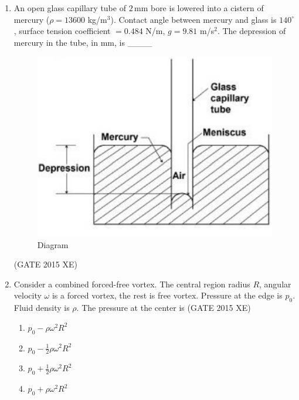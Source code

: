 \documentclass[journal,12pt,onecolumn]{IEEEtran}
\begin{document}
\begin{enumerate}
\hfill{(GATE 2015 XE)} 
\begin{multicols}{4}
\begin{enumerate}
\item $\frac{\mu}{\rho h^2}$
\item $0$
\item $\dfrac{1}{h^2} \sqrt{\frac{\mu \nu h}{\rho}}$
\item $\frac{U}{h}$
\end{enumerate}
\end{multicols}

\item An open glass capillary tube of $2\,\mathrm{mm}$ bore is lowered into a cistern of mercury ($\rho=13600$ kg/m$^3$). Contact angle between mercury and glass is $140^\circ$, surface tension coefficient $=0.484$ N/m, $g=9.81$ m/s$^2$. The depression of mercury in the tube, in mm, is \_\_\_\_

\begin{figure}[htbp]
  \centering
  \includegraphics[width=.38\columnwidth]{figs/B/fig2.png} 
  \caption{Diagram}
  \label{fig:figs/B/fig2.png}
\end{figure}

\hfill{(GATE 2015 XE)} \\


\item Consider a combined forced-free vortex. The central region radius $R$, angular velocity $\omega$ is a forced vortex, the rest is free vortex. Pressure at the edge is $p_0$. Fluid density is $\rho$. The pressure at the center is  
\hfill{(GATE 2015 XE)} \\
\begin{multicols}{2}
\begin{enumerate}
\item $p_0 - \rho \omega^2 R^2$
\item $p_0 - \tfrac12 \rho \omega^2 R^2$
\item $p_0 + \tfrac12 \rho \omega^2 R^2$
\item $p_0 + \rho \omega^2 R^2$
\end{enumerate}
\end{multicols}


\end{enumerate}
\end{document}
